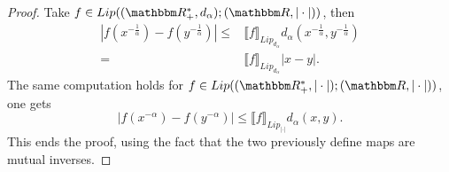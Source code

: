 \documentclass[a4paper,11pt, reqno]{amsart}
\newcommand{\1}{\mathbbm{1}}
\theoremstyle{plain}
\newtheorem{proposition}[theorem]{Proposition}
\theoremstyle{definition}
\begin{document}
\begin{proof}
    Take $f \in Lip((\RR_+^*,d_\alpha);(\RR,|\cdot|))$, then 
    \begin{align*}
        \left|
            f\left(x^{-\frac{1}{\alpha}}\right)- f\left(y^{-\frac{1}{\alpha}}\right)
        \right| 
        \le  &
        \llbracket f \rrbracket_{Lip_{d_\alpha}} 
        d_{\alpha}
            \left(
                x^{-\frac{1}{\alpha}},
                y^{-\frac{1}{\alpha}}
            \right)
        \\ 
        = & 
        \llbracket f \rrbracket_{Lip_{d_\alpha}} |x-y|.
    \end{align*}
    The same computation holds for $f \in Lip((\RR_+^*,|\cdot|);(\RR,|\cdot|))$, one gets 
    \[\left|
            f\left(x^{-\alpha}\right)- f\left(y^{-\alpha}\right)
        \right| \le \llbracket f \rrbracket_{Lip_{|\cdot |}} d_\alpha(x,y)  .\]
        This ends the proof, using the fact that the two previously define maps are mutual inverses. 
\end{proof}
   

  
  
  
\end{document}

